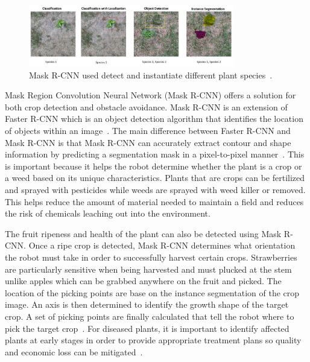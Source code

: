 \documentclass[12pt]{article}
\begin{document}
\begin{figure}[h]
\centering
\includegraphics[width=0.80\textwidth]{weedDetection.PNG}
\caption{Mask R-CNN used detect and instantiate different plant species~\cite{valicharla2021weed}.}
\end{figure}

Mask Region Convolution Neural Network (Mask R-CNN) offers a solution for both crop detection and obstacle avoidance. Mask R-CNN is an extension of Faster R-CNN which is an object detection algorithm that identifies the location of objects within an image~\cite{dollar2017mask, yu2019fruit, chu2021deep}. The main difference between Faster R-CNN and Mask R-CNN is that Mask R-CNN can accurately extract contour and shape information by predicting a segmentation mask in a pixel-to-pixel manner~\cite{dollar2017mask, yu2019fruit}. This is important because it helps the robot determine whether the plant is a crop or a weed based on its unique characteristics. Plants that are crops can be fertilized and sprayed with pesticides while weeds are sprayed with weed killer or removed. This helps reduce the amount of material needed to maintain a field and reduces the risk of chemicals leaching out into the environment.

The fruit ripeness and health of the plant can also be detected using Mask R-CNN. Once a ripe crop is detected, Mask R-CNN determines what orientation the robot must take in order to successfully harvest certain crops. Strawberries are particularly sensitive when being harvested and must plucked at the stem unlike apples which can be grabbed anywhere on the fruit and picked. The location of the picking points are base on the instance segmentation of the crop image. An axis is then determined to identify the growth shape of the target crop. A set of picking points are finally calculated that tell the robot where to pick the target crop~\cite{yu2019fruit}. For diseased plants, it is important to identify affected plants at early stages in order to provide appropriate treatment plans so quality and economic loss can be mitigated~\cite{afzaal2021instance}.
\end{document}
